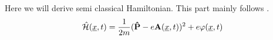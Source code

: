 \label{sec:semiclassichamilton}
Here we will derive semi classical Hamiltonian. This part mainly follows \cite{LandauLifschitzBand2}.
\begin{equation}
    \hat{\mathcal{H}}(\underline{x}, t) = \frac{1}{2m}(\mathbf{\hat{P}} - e \mathbf{A}(\underline{x}, t))^2 + e \varphi(\underline{x}, t)
\end{equation}